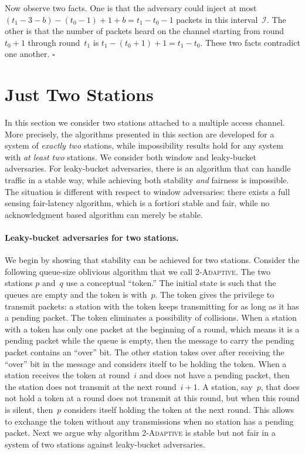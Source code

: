 \documentclass[11pt]{article}
\newcommand{\BBB}{\vspace*{-\bigskipamount}}
\newcommand{\cI}{\mathcal{I}}
\newcommand{\Paragraph}[1]{\BBB\paragraph{#1}}
\newcommand{\qed}{\hfill $\square$ \smallbreak}
\newenvironment{proof}{\noindent{\bf Proof:}}{\qed}
\begin{document}
\begin{proof}
Now observe two facts.
One is that the adversary could inject at most $(t_1-3-b) - (t_0-1) + 1+b=t_1-t_0-1$ packets in this interval~$\cI$.
The other is that the number of packets heard on the channel starting from round~$t_0+1$ through round~$t_1$ is $t_1-(t_0+1)+1=t_1-t_0$.
These two facts contradict one another.
\end{proof}








\section{Just Two Stations}

\label{sec:two}




In this section we consider two stations attached to a multiple access channel.
More precisely, the algorithms presented in this section are developed for a system of \emph{exactly two} stations, while impossibility results hold for any system with \emph{at least two} stations.
We consider both window and leaky-bucket adversaries.
For leaky-bucket adversaries, there is an algorithm that can handle traffic in a stable way, while achieving both stability \emph{and} fairness is impossible.
The situation is different with respect to window adversaries: there exists a full sensing fair-latency algorithm, which is a fortiori stable and fair, while no acknowledgment based algorithm can merely be stable.






\Paragraph{Leaky-bucket adversaries for two stations.}





We begin by showing that stability can be achieved for two stations.
Consider the following queue-size oblivious algorithm that we call \textsc{2-Adaptive}.
The two stations $p$ and~$q$ use a conceptual ``token.'' 
The initial state is such that the queues are empty and the token is with~$p$.
The token gives the privilege to transmit packets: a station with the token keeps transmitting for as long as it has a pending packet.
The token eliminates a possibility of collisions.
When a station with a token has only one packet at the beginning of a round, which means it is a pending packet while the queue is empty, then the message to carry the pending packet contains an ``over'' bit.
The other station takes over after receiving the ``over'' bit in the message and considers itself to be holding the token.
When a station receives the token at round~$i$ and does not have a pending packet,  then the station does not transmit at the next round~$i+1$.
A station, say~$p$, that does not hold a token at a round does not transmit at this round, but when this round is silent, then~$p$ considers itself holding the token at the next round.
This allows to exchange the token without any transmissions when no station has a pending packet.
Next we argue why algorithm  \textsc{2-Adaptive} is stable but not fair in a system of two stations against leaky-bucket adversaries.
\end{document}

